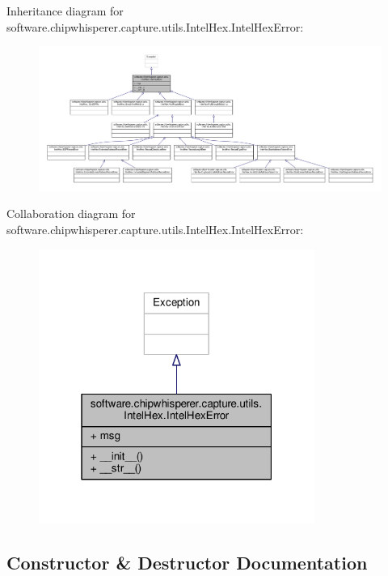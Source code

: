 Inheritance diagram for software.\+chipwhisperer.\+capture.\+utils.\+Intel\+Hex.\+Intel\+Hex\+Error\+:\nopagebreak
\begin{figure}[H]
\begin{center}
\leavevmode
\includegraphics[width=350pt]{db/d34/classsoftware_1_1chipwhisperer_1_1capture_1_1utils_1_1IntelHex_1_1IntelHexError__inherit__graph}
\end{center}
\end{figure}


Collaboration diagram for software.\+chipwhisperer.\+capture.\+utils.\+Intel\+Hex.\+Intel\+Hex\+Error\+:\nopagebreak
\begin{figure}[H]
\begin{center}
\leavevmode
\includegraphics[width=256pt]{d8/d07/classsoftware_1_1chipwhisperer_1_1capture_1_1utils_1_1IntelHex_1_1IntelHexError__coll__graph}
\end{center}
\end{figure}


\subsection{Constructor \& Destructor Documentation}
\hypertarget{classsoftware_1_1chipwhisperer_1_1capture_1_1utils_1_1IntelHex_1_1IntelHexError_aaf5a9eb326933bdfa3545c9b3db84d3b}{}
